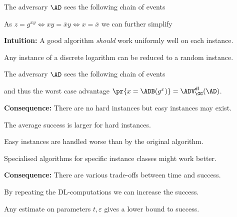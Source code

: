 \documentclass[landscape,footrule]{foils}
\newcommand{\lastline}{\vspace*{-2ex}}
\begin{document}

The adversary $\AD$ sees the following chain of events 

As $z=g^{xy} \Leftrightarrow xy = \overline{x}y \Leftrightarrow x=\overline{x}$ we can further simplify



\textbf{Intuition:} A good algorithm \emph{should} work uniformly well on each instance.




Any instance of a discrete logarithm can be reduced to a random instance.  


The adversary $\AD$ sees the following chain of events 


and thus the worst case advantage $\pr{x=\ADB(g^x)}=\advDLXX{\GG}{\AD}$.\lastline



\textbf{Consequence:} There are no hard instances but easy instances may exist.


\begin{triangles}
  \item The average success is larger for hard instances.
  \item Easy instances are handled worse than by the original algorithm. 
  \item Specialised algorithms for specific instance classes might work better.
\end{triangles}



\textbf{Consequence:} There are various trade-offs between time and success.
\begin{triangles}
  \item By repeating the DL-computations we can increase the success.
  \item Any estimate on parameters $t,\varepsilon$ gives a lower bound to success.
\end{triangles}

\end{document}
